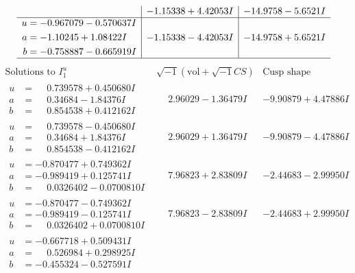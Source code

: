 \documentclass[1p]{elsarticle_modified}
\theoremstyle{definition}
\newcommand{\I}{\sqrt{-1}}
\begin{document}
$$\begin{array}{c|c|c}
 & -1.15338 + 4.42053 I & -14.9758 - 5.6521 I \\ \hline\begin{aligned}
u &= -0.967079 - 0.570637 I \\
a &= -1.10245 + 1.08422 I \\
b &= -0.758887 - 0.665919 I\end{aligned}
 & -1.15338 - 4.42053 I & -14.9758 + 5.6521 I\\
 \hline 
 \end{array}$$\newpage$$\begin{array}{c|c|c}  
\text{Solutions to }I^u_{1}& \I (\text{vol} + \sqrt{-1}CS) & \text{Cusp shape}\\
 \hline 
\begin{aligned}
u &= \phantom{-}0.739578 + 0.450680 I \\
a &= \phantom{-}0.34684 - 1.84376 I \\
b &= \phantom{-}0.854538 + 0.412162 I\end{aligned}
 & \phantom{-}2.96029 - 1.36479 I & -9.90879 + 4.47886 I \\ \hline\begin{aligned}
u &= \phantom{-}0.739578 - 0.450680 I \\
a &= \phantom{-}0.34684 + 1.84376 I \\
b &= \phantom{-}0.854538 - 0.412162 I\end{aligned}
 & \phantom{-}2.96029 + 1.36479 I & -9.90879 - 4.47886 I \\ \hline\begin{aligned}
u &= -0.870477 + 0.749362 I \\
a &= -0.989419 + 0.125741 I \\
b &= \phantom{-}0.0326402 - 0.0700810 I\end{aligned}
 & \phantom{-}7.96823 + 2.83809 I & -2.44683 - 2.99950 I \\ \hline\begin{aligned}
u &= -0.870477 - 0.749362 I \\
a &= -0.989419 - 0.125741 I \\
b &= \phantom{-}0.0326402 + 0.0700810 I\end{aligned}
 & \phantom{-}7.96823 - 2.83809 I & -2.44683 + 2.99950 I \\ \hline\begin{aligned}
u &= -0.667718 + 0.509431 I \\
a &= \phantom{-}0.526984 + 0.298925 I \\
b &= -0.455324 - 0.527591 I\end{aligned}

\end{array}$$
\end{document}
